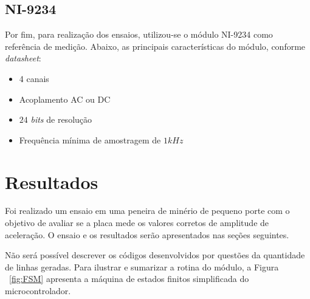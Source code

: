 \documentclass[
	12pt,				%
	openright,			%
	twoside,			%
	a4paper,			%
	english,			%
	french,				%
	spanish,			%
	brazil,				%
	]{abntex2}
\begin{document}
	\section{NI-9234}
		Por fim, para realização dos ensaios, utilizou-se o módulo NI-9234 como referência de medição. Abaixo, as principais características do módulo, conforme \textit{datasheet}\cite{ni9234}:

		\begin{itemize}
			\item 4 canais
			\item Acoplamento AC ou DC
			\item $24$ \textit{bits} de resolução
			\item Frequência mínima de amostragem de $1kHz$
		\end{itemize}

\chapter{Resultados}
	Foi realizado um ensaio em uma peneira de minério de pequeno
	porte com o objetivo de avaliar se a placa mede os valores corretos
	de amplitude de aceleração. O ensaio e os resultados serão
	apresentados nas seções seguintes.

	Não será possível descrever os códigos desenvolvidos por
	questões da quantidade de linhas geradas. Para ilustrar e sumarizar a rotina do módulo,
	a Figura ~\ref{fig:FSM} apresenta a máquina de estados finitos simplificada do
	microcontrolador.
\end{document}
